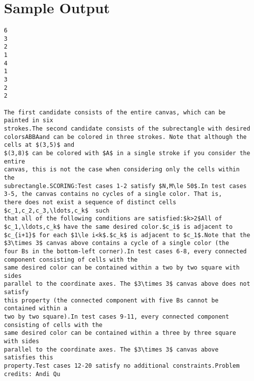 \documentclass[12pt]{article}
\begin{document}
\section*{Sample Output}
\begin{verbatim}
6
3
2
1
4
1
3
2
2

The first candidate consists of the entire canvas, which can be painted in six
strokes.The second candidate consists of the subrectangle with desired colorsABBAand can be colored in three strokes. Note that although the cells at $(3,5)$ and
$(3,8)$ can be colored with $A$ in a single stroke if you consider the entire
canvas, this is not the case when considering only the cells within the
subrectangle.SCORING:Test cases 1-2 satisfy $N,M\le 50$.In test cases 3-5, the canvas contains no cycles of a single color. That is,
there does not exist a sequence of distinct cells $c_1,c_2,c_3,\ldots,c_k$  such
that all of the following conditions are satisfied:$k>2$All of $c_1,\ldots,c_k$ have the same desired color.$c_i$ is adjacent to $c_{i+1}$ for each $1\le i<k$.$c_k$ is adjacent to $c_1$.Note that the $3\times 3$ canvas above contains a cycle of a single color (the
four Bs in the bottom-left corner).In test cases 6-8, every connected component consisting of cells with the
same desired color can be contained within a two by two square with sides
parallel to the coordinate axes. The $3\times 3$ canvas above does not satisfy
this property (the connected component with five Bs cannot be contained within a
two by two square).In test cases 9-11, every connected component consisting of cells with the
same desired color can be contained within a three by three square with sides
parallel to the coordinate axes. The $3\times 3$ canvas above satisfies this
property.Test cases 12-20 satisfy no additional constraints.Problem credits: Andi Qu


\end{verbatim}
\end{document}
